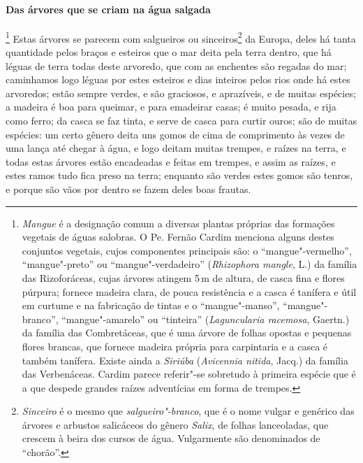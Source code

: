 \begin{linenumbers}
\paragraph{Das árvores que se criam na água salgada}\quad
{}\footnote{ \textit{Mangue} é a designação
comum a diversas plantas próprias das formações vegetais de águas
salobras. O Pe. Fernão Cardim menciona alguns destes conjuntos
vegetais, cujos componentes principais são: o ``mangue"-vermelho'', 
``mangue"-preto'' ou ``mangue"-verdadeiro'' (\textit{Rhizophora mangle}, L.)
da família das Rizoforáceas, cujas árvores atingem 5\,m de altura, de
casca fina e flores púrpura; fornece madeira clara, de pouca
resistência e a casca é tanífera e útil em curtume e na fabricação de
tintas e o ``mangue"-manso'', ``mangue"-branco'', ``mangue"-amarelo'' ou
``tinteira'' (\textit{Laguncularia racemosa}, Gaertn.) da família das
Combretáceas, que é uma árvore de folhas opostas e pequenas flores
brancas, que fornece madeira própria para carpintaria e a casca é
também tanífera. Existe ainda a \textit{Siriúba} (\textit{Avicennia
nitida}, Jacq.) da família das Verbenáceas. Cardim parece referir"-se
sobretudo à primeira espécie que é a que despede grandes raízes
adventícias em forma de trempes.} Estas árvores se parecem
com salgueiros ou sinceiros\footnote{ \textit{Sinceiro} é o mesmo que
\textit{salgueiro"-branco}, que é o nome vulgar e genérico das árvores e
arbustos salicáceos do gênero \textit{Salix}, de folhas lanceoladas,
que crescem à beira dos cursos de água. Vulgarmente são denominados de
``chorão''.} da Europa, deles há tanta quantidade pelos braços e esteiros
que o mar deita pela terra dentro, que há léguas de terra todas deste
arvoredo, que com as enchentes são regadas do mar; caminhamos logo
léguas por estes esteiros e dias inteiros pelos rios onde há estes
arvoredos; estão sempre verdes, e são graciosos, e aprazíveis, e de
muitas espécies; a madeira é boa para queimar, e para emadeirar casas;
é muito pesada, e rija como ferro; da casca se faz tinta, e serve de
casca para curtir ouros; são de muitas espécies: um certo gênero deita
uns gomos de cima de comprimento às vezes de uma lança até chegar à
água, e logo deitam muitas trempes, e raízes na terra, e todas estas
árvores estão encadeadas e feitas em trempes, e assim as raízes, e
estes ramos tudo fica preso na terra; enquanto são verdes estes gomos
são tenros, e porque são vãos por dentro se fazem deles boas frautas.


\end{linenumbers}
